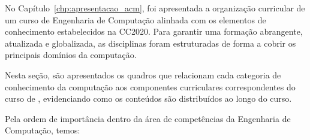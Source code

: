 

No Capítulo~\ref{chp:apresentacao_acm}, foi apresentada a organização curricular de um curso de Engenharia de Computação alinhada com os elementos de conhecimento estabelecidos na CC2020. Para garantir uma formação abrangente, atualizada e globalizada, as disciplinas foram estruturadas de forma a cobrir os principais domínios da computação.
 
Nesta seção, são apresentados os quadros que relacionam cada categoria de conhecimento da computação aos componentes curriculares correspondentes do curso de \nomecursonovo, evidenciando como os conteúdos são distribuídos ao longo do curso.

Pela ordem de importância dentro da área de competências da Engenharia de Computação, temos:

